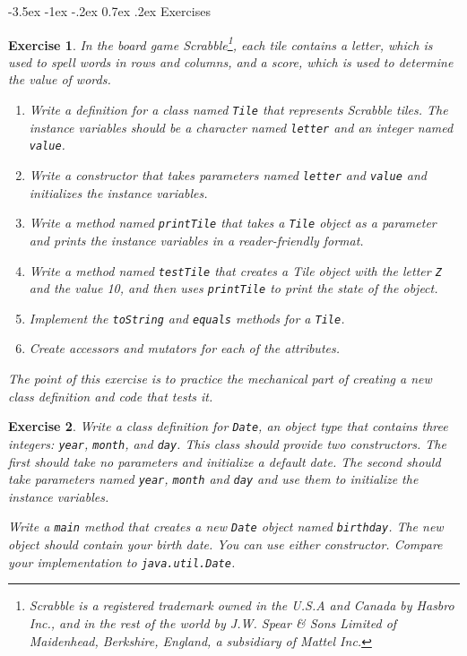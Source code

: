 \documentclass[12pt]{book}
\makeatletter
\renewcommand{\section}{\@startsection {section}{1}{\z@}%
    {-3.5ex \@plus -1ex \@minus -.2ex}%
    {0.7ex \@plus.2ex}%
    {\normalfont\Large\bfseries}}
\theoremstyle{exercise}
\newtheorem{exercise}{Exercise}[chapter]
\newcommand{\java}[1]{\lstinline{#1}} %
\makeatother
\begin{document}
\section{Exercises}


\begin{exercise}
In the board game Scrabble\footnote{Scrabble is a registered trademark owned in the U.S.A and Canada by Hasbro Inc., and in the rest of the world by J.W. Spear \& Sons Limited of Maidenhead, Berkshire, England, a subsidiary of Mattel Inc.}, each tile contains a letter, which is used to spell words in rows and columns, and a score, which is used to determine the value of words.

\begin{enumerate}

\item Write a definition for a class named \java{Tile} that represents Scrabble tiles.
The instance variables should be a character named \java{letter} and an integer named \java{value}.

\item Write a constructor that takes parameters named \java{letter} and \java{value} and initializes the instance variables.

\item Write a method named \java{printTile} that takes a \java{Tile} object as a parameter and prints the instance variables in a reader-friendly format.

\item Write a method named \java{testTile} that creates a Tile object with the letter \java{Z} and the value 10, and then uses \java{printTile} to print the state of the object.

\item Implement the \java{toString} and \java{equals} methods for a \java{Tile}.

\item Create accessors and mutators for each of the attributes.

\end{enumerate}

The point of this exercise is to practice the mechanical part of creating a new class definition and code that tests it.
\end{exercise}


\begin{exercise}
Write a class definition for \java{Date}, an object type that contains three integers: \java{year}, \java{month}, and \java{day}.
This class should provide two constructors.
The first should take no parameters and initialize a default date.
The second should take parameters named \java{year}, \java{month} and \java{day} and use them to initialize the instance variables.

Write a \java{main} method that creates a new \java{Date} object named \java{birthday}.
The new object should contain your birth date.
You can use either constructor.
Compare your implementation to \java{java.util.Date}.
\end{exercise}
\end{document}
